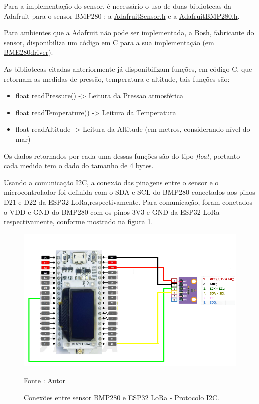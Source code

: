 Para a implementação do sensor, é necessário o uso de duas bibliotecas da Adafruit para o sensor BMP280 \cite{Adafruit}: a  \href{https://github.com/adafruit/Adafruit_BMP280_Library}{Adafruit\textunderscore Sensor.h} e a \href{https://github.com/adafruit/Adafruit_Sensor}{Adafruit\textunderscore BMP280.h}.

Para ambientes que a Adafruit não pode ser implementada, a Bosh, fabricante do sensor, disponibiliza um código em C para a sua implementação (em \href{https://github.com/BoschSensortec/BME280_driver}{BME280\textunderscore driver}).

As bibliotecas citadas anteriormente já disponibilizam funções, em código C, que retornam as medidas de pressão, temperatura e altitude, tais funções são:

	\begin{itemize}
	    \item float readPressure() -> Leitura da Pressao atmosférica
	    \item float readTemperature() -> Leitura da Temperatura
	    \item float readAltitude -> Leitura da Altitude (em metros, considerando nível do mar)
	\end{itemize} 

Os dados retornados por cada uma dessas funções são do tipo \textit{float}, portanto cada medida tem o dado do tamanho de 4 bytes.

Usando a comunicação I2C, a conexão das pinagens entre o sensor e o microcontrolador foi definida com o SDA e SCL do BMP280 conectados aos pinos D21 e D22 da ESP32 LoRa,respectivamente. Para comunicação, foram conetados o VDD e GND do BMP280 com os pinos 3V3 e GND da ESP32 LoRa respectivamente, conforme mostrado na figura \ref{fig:PINAGEM_BMP280}. 

\begin{figure}[H]
  \centering
  \includegraphics[scale=0.35]{figuras/PINAGEM_BMP280.png}
  \caption{Conexões entre sensor BMP280 e ESP32 LoRa - Protocolo I2C.} 
  {\footnotesize Fonte : Autor } 
  \label{fig:PINAGEM_BMP280}
\end{figure}

